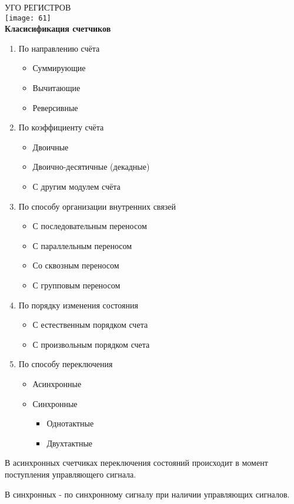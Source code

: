 УГО РЕГИСТРОВ\\
\texttt{[image: 61]}\\

\newpage
\textbf{Класисификация счетчиков}
\begin{enumerate}
  \item По направлению счёта
  \begin{itemize}
    \item Суммирующие
    \item Вычитающие
    \item Реверсивные
  \end{itemize}
  \item По коэффициенту счёта
  \begin{itemize}
    \item Двоичные
    \item Двоично-десятичные (декадные)
    \item С другим модулем счёта
  \end{itemize}
  \item По способу организации внутренних связей
  \begin{itemize}
    \item С последовательным переносом
    \item С параллельным переносом
    \item Со сквозным переносом
    \item С групповым переносом
  \end{itemize}
  \item По порядку изменения состояния
  \begin{itemize}
    \item С естественным порядком счета
    \item С произвольным порядком счета
  \end{itemize}
  \item По способу переключения
  \begin{itemize}
    \item Асинхронные
    \item Синхронные
    \begin{itemize}
      \item Однотактные
      \item Двухтактные
    \end{itemize}
  \end{itemize}
\end{enumerate}

В асинхронных счетчиках переключения состояний происходит
в момент поступления управляющего сигнала.

В синхронных - по синхронному сигналу при наличии управляющих сигналов.
